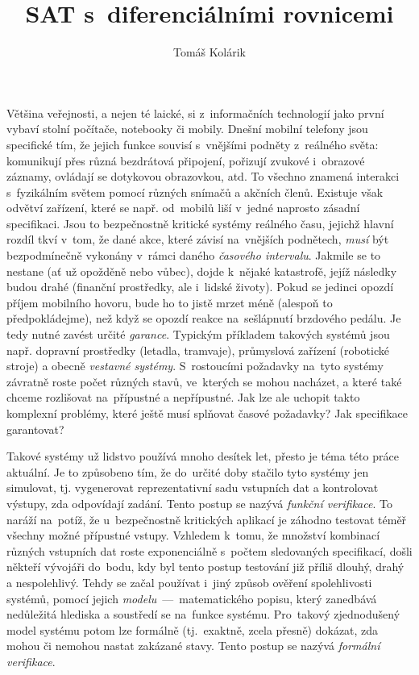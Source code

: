 \documentclass[thesis=M,czech]{FITthesis}[2012/06/26]
\title{SAT s~diferenciálními rovnicemi}
\author{Tomáš Kolárik} %
\newcommand{\hl}[1]{\textit{#1}}
\newcommand{\name}[1]{\hl{#1}}
\begin{document}

\begin{introduction}\label{ch:intro}
Většina veřejnosti, a nejen té laické,
si z~informačních technologií
jako první vybaví stolní počítače,
notebooky či mobily.
Dnešní mobilní telefony jsou specifické tím,
že jejich funkce souvisí s~vnějšími podněty z~reálného světa:
komunikují přes různá bezdrátová připojení,
pořizují zvukové i~obrazové záznamy,
ovládají se dotykovou obrazovkou, atd.
To všechno znamená interakci s~fyzikálním světem
pomocí různých snímačů a akčních členů.
Existuje však odvětví zařízení,
které se např. od~mobilů liší v~jedné
naprosto zásadní specifikaci.
Jsou to bezpečnostně kritické systémy reálného času,
jejichž hlavní rozdíl tkví v~tom,
že dané akce, které závisí na~vnějších podnětech,
\hl{musí} být bezpodmínečně vykonány
v~rámci daného \hl{časového intervalu}.
Jakmile se to nestane (ať už opožděně nebo vůbec),
dojde k~nějaké katastrofě,
jejíž následky budou drahé
(finanční prostředky, ale i~lidské životy).
Pokud se jedinci opozdí příjem mobilního hovoru,
bude ho to jistě mrzet méně
(alespoň to předpokládejme),
než když se opozdí reakce na~sešlápnutí brzdového pedálu.
Je tedy nutné zavést určité \hl{garance}.
Typickým příkladem takových systémů
jsou např. dopravní prostředky (letadla, tramvaje),
průmyslová zařízení (robotické stroje)
a obecně \name{vestavné systémy}.
S~rostoucími požadavky na~tyto systémy
závratně roste počet různých stavů,
ve~kterých se mohou nacházet,
a které také chceme rozlišovat
na~přípustné a nepřípustné.
Jak lze ale uchopit takto komplexní problémy,
které ještě musí splňovat časové požadavky?
Jak specifikace garantovat?

Takové systémy už lidstvo používá mnoho desítek let,
přesto je téma této práce aktuální.
Je to způsobeno tím,
že do~určité doby stačilo tyto systémy jen simulovat,
tj. vygenerovat reprezentativní sadu vstupních dat
a kontrolovat výstupy, zda odpovídají zadání.
Tento postup se nazývá \name{funkční verifikace}.
To naráží na~potíž,
že u~bezpečnostně kritických aplikací je záhodno
testovat téměř všechny možné přípustné vstupy.
Vzhledem k~tomu,
že množství kombinací různých vstupních dat
roste exponenciálně s~počtem sledovaných specifikací,
došli někteří vývojáři do~bodu,
kdy byl tento postup testování již příliš
dlouhý, drahý a nespolehlivý.
Tehdy se začal používat i~jiný způsob
ověření spolehlivosti systémů,
pomocí jejich \name{modelu}~---~matematického popisu,
který zanedbává nedůležitá hlediska
a soustředí se na~funkce systému.
Pro~takový zjednodušený model systému
potom lze formálně (tj.~exaktně, zcela přesně) dokázat,
zda mohou či nemohou nastat zakázané stavy.
Tento postup se nazývá \name{formální verifikace}.


\end{introduction}
\end{document}
